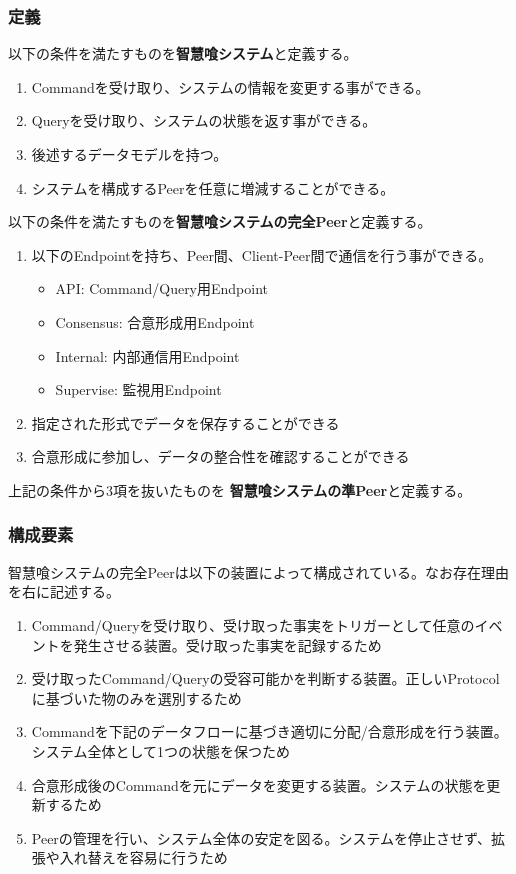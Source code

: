 \documentclass[10pt,a4paper]{jarticle}
\begin{document}
\begin{multicols}{2}
\subsubsection{定義}
以下の条件を満たすものを{\bf 智慧喰システム}と定義する。
\begin{enumerate}
  \item Commandを受け取り、システムの情報を変更する事ができる。
  \item Queryを受け取り、システムの状態を返す事ができる。
  \item 後述するデータモデルを持つ。
  \item システムを構成するPeerを任意に増減することができる。
\end{enumerate}
以下の条件を満たすものを{\bf 智慧喰システムの完全Peer}と定義する。
\begin{enumerate}
  \item 以下のEndpointを持ち、Peer間、Client-Peer間で通信を行う事ができる。
    \begin{itemize}
      \item API: Command/Query用Endpoint
      \item Consensus: 合意形成用Endpoint
      \item Internal: 内部通信用Endpoint
      \item Supervise: 監視用Endpoint
    \end{itemize}
  \item 指定された形式でデータを保存することができる
  \item 合意形成に参加し、データの整合性を確認することができる
\end{enumerate}
上記の条件から3項を抜いたものを {\bf 智慧喰システムの準Peer}と定義する。

\subsubsection{構成要素}
智慧喰システムの完全Peerは以下の装置によって構成されている。なお存在理由を右に記述する。
\begin{enumerate}
  \item Command/Queryを受け取り、受け取った事実をトリガーとして任意のイベントを発生させる装置。受け取った事実を記録するため
  \item 受け取ったCommand/Queryの受容可能かを判断する装置。正しいProtocolに基づいた物のみを選別するため
  \item Commandを下記のデータフローに基づき適切に分配/合意形成を行う装置。システム全体として1つの状態を保つため
  \item 合意形成後のCommandを元にデータを変更する装置。システムの状態を更新するため
  \item Peerの管理を行い、システム全体の安定を図る。システムを停止させず、拡張や入れ替えを容易に行うため  
\end{enumerate}


\end{multicols}
\end{document}
